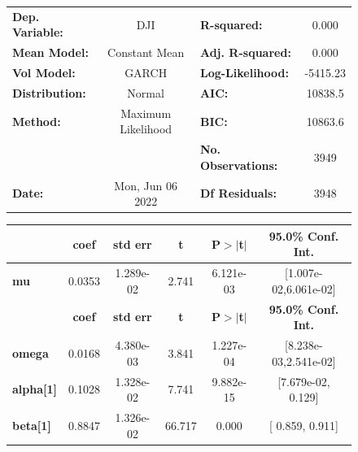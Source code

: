 \documentclass[a4paper, oneside]{discothesis}
\begin{document}
\begin{figure}
\begin{multicols}{2}
{  
\begin{center}
\begin{tabular}{lclc}
\toprule
\textbf{Dep. Variable:} &         DJI        & \textbf{  R-squared:         } &     0.000   \\
\textbf{Mean Model:}    &   Constant Mean    & \textbf{  Adj. R-squared:    } &     0.000   \\
\textbf{Vol Model:}     &       GARCH        & \textbf{  Log-Likelihood:    } &   -5415.23  \\
\textbf{Distribution:}  &       Normal       & \textbf{  AIC:               } &    10838.5  \\
\textbf{Method:}        & Maximum Likelihood & \textbf{  BIC:               } &    10863.6  \\
\textbf{}               &                    & \textbf{  No. Observations:  } &    3949     \\
\textbf{Date:}          &  Mon, Jun 06 2022  & \textbf{  Df Residuals:      } &    3948     \\
\bottomrule
\end{tabular}
\begin{tabular}{lccccc}
            & \textbf{coef} & \textbf{std err} & \textbf{t} & \textbf{P$> |$t$|$} & \textbf{95.0\% Conf. Int.}  \\
\midrule
\textbf{mu} &       0.0353  &    1.289e-02     &     2.741  &      6.121e-03       &   [1.007e-02,6.061e-02]     \\
                  & \textbf{coef} & \textbf{std err} & \textbf{t} & \textbf{P$> |$t$|$} & \textbf{95.0\% Conf. Int.}  \\
\midrule
\textbf{omega}    &       0.0168  &    4.380e-03     &     3.841  &      1.227e-04       &   [8.238e-03,2.541e-02]     \\
\textbf{alpha[1]} &       0.1028  &    1.328e-02     &     7.741  &      9.882e-15       &    [7.679e-02,  0.129]      \\
\textbf{beta[1]}  &       0.8847  &    1.326e-02     &    66.717  &        0.000         &     [  0.859,  0.911]       \\
\bottomrule
\end{tabular}
\end{center}

}
\end{multicols}
\end{figure}
\end{document}
